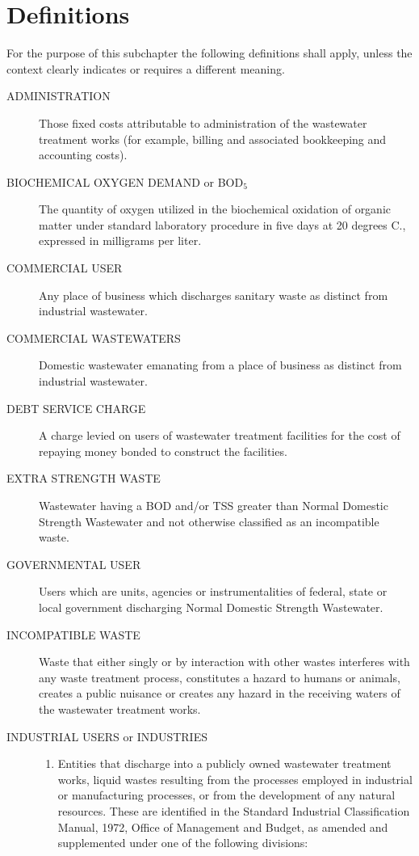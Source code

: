 \section{Definitions}
For the purpose of this subchapter the following definitions shall apply, unless the context clearly indicates or requires a different meaning.
\begin{description}
\item[ADMINISTRATION] Those fixed costs attributable to administration of the wastewater treatment works (for example, billing and associated bookkeeping and accounting costs).
\item[BIOCHEMICAL OXYGEN DEMAND or BOD$_{5}$] The quantity of oxygen utilized in the biochemical oxidation of organic matter under standard laboratory procedure in five days at 20 degrees C., expressed in milligrams per liter.
\item[COMMERCIAL USER] Any place of business which discharges sanitary waste as distinct from industrial wastewater.
\item[COMMERCIAL WASTEWATERS] Domestic wastewater emanating from a place of business as distinct from industrial wastewater.
\item[DEBT SERVICE CHARGE] A charge levied on users of wastewater treatment facilities for the cost of repaying money bonded to construct the facilities.
\item[EXTRA STRENGTH WASTE] Wastewater having a BOD and/or TSS greater than Normal Domestic Strength Wastewater and not otherwise classified as an incompatible waste.
\item[GOVERNMENTAL USER] Users which are units, agencies or instrumentalities of federal, state or local government discharging Normal Domestic Strength Wastewater.
\item[INCOMPATIBLE WASTE] Waste that either singly or by interaction with other wastes interferes with any waste treatment process, constitutes a hazard to humans or animals, creates a public nuisance or creates any hazard in the receiving waters of the wastewater treatment works.
\item[INDUSTRIAL USERS or INDUSTRIES]
\begin{enumerate}
\item Entities that discharge into a publicly owned wastewater treatment works, liquid wastes resulting from the processes employed in industrial or manufacturing processes, or from the development of any natural resources.  These are identified in the Standard Industrial Classification Manual, 1972, Office of Management and Budget, as amended and supplemented under one of the following divisions:

\end{enumerate}
\end{description}
